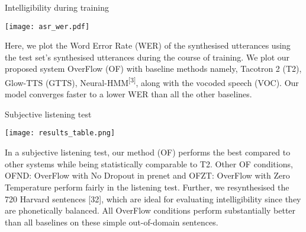 
\begin{tcolorbox}
    \begin{center}
        Intelligibility during training
    \end{center}	

\end{tcolorbox}
\begin{center}
	\texttt{[image: asr\_wer.pdf]}
\end{center}
Here, we plot the Word Error Rate (WER) of the synthesised utterances using the test set's synthesised utterances during the course of training. We plot our proposed system OverFlow (OF) with baseline methods namely, Tacotron 2 (T2), Glow-TTS (GTTS), Neural-HMM\textsuperscript{[3]}, along with the vocoded speech (VOC). Our model converges faster to a lower WER than all the other baselines.

\vspace{1.5em}

\begin{tcolorbox}
    \begin{center}
        Subjective listening test
    \end{center}
\end{tcolorbox}

\begin{center}
	\texttt{[image: results\_table.png]}
\end{center}
In a subjective listening test, our method (OF) performs the best compared to other systems while being statistically comparable to T2. Other OF conditions, OFND: OverFlow with No Dropout in prenet and OFZT: OverFlow with Zero Temperature perform fairly in the listening test. Further, we resynthesised the 720 Harvard sentences [32], which are ideal for evaluating intelligibility since they are phonetically balanced. All OverFlow conditions perform substantially better than all baselines on these simple out-of-domain sentences.
\par
\vspace{1.5em}
\par

